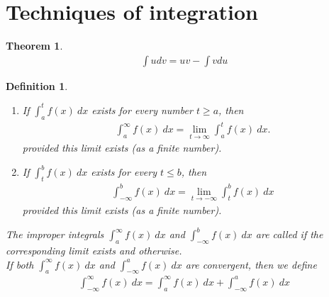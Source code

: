 \documentclass{article}
\theoremstyle{sltheorem}
\newtheorem{definition}{Definition}[section]
\newtheorem{theorem}{Theorem}[section]
\begin{document}
\section{Techniques of integration}
\begin{theorem}
    \begin{align*}
        \int u dv = uv - \int v du
    \end{align*}
\end{theorem}
\begin{definition}
    \begin{enumerate}
        \item If $\int_a^t f(x)\:dx$ exists for every number $t\geq a$, then
        \begin{align*}
            \int_a^\infty f(x)\:dx = \lim_{t\to \infty}\int_a^t f(x)\:dx.
        \end{align*}
        provided this limit exists (as a finite number).
        \item If $\int_t^b f(x)\:dx$ exists for every $t\leq b$, then
        \begin{align*}
            \int_{-\infty}^b f(x)\: dx = \lim_{t\to-\infty}\int_t^b f(x)\:dx
        \end{align*}
        provided this limit exists (as a finite number).
    \end{enumerate}
    The improper integrals $\int_a^\infty f(x)\:dx$ and $\int_{-\infty}^b f(x)\:dx$ are called  if the corresponding limit exists and  otherwise.\\
    If both  $\int_a^\infty f(x)\:dx$ and $\int_{-\infty}^a f(x)\:dx$ are convergent, then we define
    \begin{align*}
        \int_{-\infty}^\infty f(x)\:dx = \int_a^\infty f(x)\:dx + \int_{-\infty}^a f(x)\:dx
    \end{align*}
\end{definition}
\end{document}
